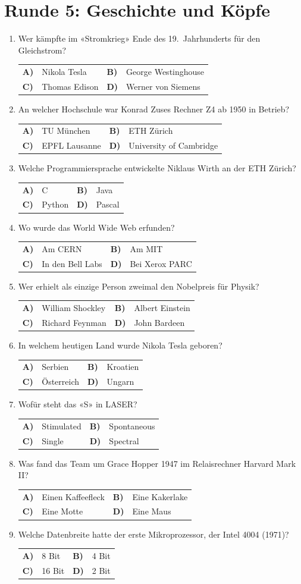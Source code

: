 \documentclass[a4paper,11pt]{article}
\makeatletter
\newif\ifloesung
\newcommand{\loesung}[1]{\ifloesung\par\smallskip\noindent\textcolor{zwetschge}{\textbf{Lösung:} #1}\fi}
\newcommand{\mc}[6]{%
  \item #1\par\nopagebreak\smallskip
  \noindent\begin{tabularx}{\linewidth}{@{}>{\bfseries}l X >{\bfseries}l X@{}}
    A) & #2 & B) & #3 \\[0.25em]
    C) & #4 & D) & #5
  \end{tabularx}%
  \loesung{#6}}
\newcommand{\runde}[2]{\section{Runde #1: #2}}
\makeatother
\begin{document}
\runde{5}{Geschichte und Köpfe}
\begin{enumerate}
  \mc{Wer kämpfte im «Stromkrieg» Ende des 19.\ Jahrhunderts für den Gleichstrom?}
     {Nikola Tesla}{George Westinghouse}{Thomas Edison}{Werner von Siemens}
     {C. Edison. Tesla und Westinghouse setzten sich mit Wechselstrom durch.}

  \mc{An welcher Hochschule war Konrad Zuses Rechner Z4 ab 1950 in Betrieb?}
     {TU München}{ETH Zürich}{EPFL Lausanne}{University of Cambridge}
     {B. An der ETH Zürich, damals einer der ersten kommerziell genutzten Computer Europas.}

  \mc{Welche Programmiersprache entwickelte Niklaus Wirth an der ETH Zürich?}
     {C}{Java}{Python}{Pascal}
     {D. Pascal (später auch Modula-2 und Oberon).}

  \mc{Wo wurde das World Wide Web erfunden?}
     {Am CERN}{Am MIT}{In den Bell Labs}{Bei Xerox PARC}
     {A. Am CERN in Genf, von Tim Berners-Lee (1989).}

  \mc{Wer erhielt als einzige Person zweimal den Nobelpreis für Physik?}
     {William Shockley}{Albert Einstein}{Richard Feynman}{John Bardeen}
     {D. John Bardeen: 1956 für den Transistor, 1972 für die Theorie der Supraleitung.}

  \mc{In welchem heutigen Land wurde Nikola Tesla geboren?}
     {Serbien}{Kroatien}{Österreich}{Ungarn}
     {B. In Smiljan, im heutigen Kroatien.}

  \mc{Wofür steht das «S» in LASER?}
     {Stimulated}{Spontaneous}{Single}{Spectral}
     {A. Light Amplification by \emph{Stimulated} Emission of Radiation.}

  \mc{Was fand das Team um Grace Hopper 1947 im Relaisrechner Harvard Mark II?}
     {Einen Kaffeefleck}{Eine Kakerlake}{Eine Motte}{Eine Maus}
     {C. Eine Motte. Sie wurde ins Logbuch geklebt, als «first actual case of bug being found».}

  \mc{Welche Datenbreite hatte der erste Mikroprozessor, der Intel 4004 (1971)?}
     {8 Bit}{4 Bit}{16 Bit}{2 Bit}
     {B. 4 Bit, ursprünglich für einen Tischrechner entwickelt.}
\end{enumerate}
\end{document}
